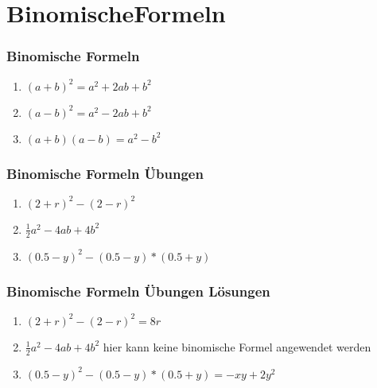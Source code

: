 \section{BinomischeFormeln}
\begin{frame}
    \frametitle{Binomische Formeln}
	\begin{enumerate}
		\setlength\itemsep{1em}
		\item $(a+b)^2 = a^2 + 2ab + b^2$
		\item $(a-b)^2 = a^2 - 2ab + b^2$
		\item $(a+b)(a-b) = a^2 - b^2$
	\end{enumerate}
\end{frame}

\begin{frame}
    \frametitle{Binomische Formeln Übungen}
	\begin{enumerate}
		\setlength\itemsep{1em}
		\item $(2+r)^2 - (2-r)^2$
		\item $\frac{1}{2}a^2 - 4ab + 4b^2$
		\item $(0.5-y)^2 - (0.5 - y)*(0.5 + y)$
	\end{enumerate}
\end{frame}

\begin{frame}
    \frametitle{Binomische Formeln Übungen Lösungen}
	\begin{enumerate}
		\setlength\itemsep{1em}
		\item $(2+r)^2 - (2-r)^2 = 8r$
		\item $\frac{1}{2}a^2 - 4ab + 4b^2$ hier kann keine binomische Formel angewendet werden
		\item $(0.5-y)^2 - (0.5 - y)*(0.5 + y) = -xy+2y^2$
	\end{enumerate}
\end{frame}


